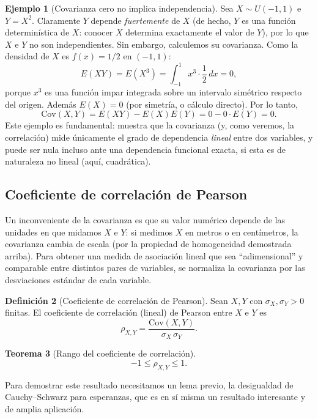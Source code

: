 \documentclass[11pt,a4paper]{article}
\theoremstyle{plain}
\newtheorem{teorema}{Teorema}[section]
\theoremstyle{definition}
\newtheorem{definicion}[teorema]{Definición}
\newtheorem{ejemplo}[teorema]{Ejemplo}
\theoremstyle{remark}
\begin{document}
\begin{ejemplo}[Covarianza cero no implica independencia]
\label{ej:cov-cero}
Sea $X\sim U(-1,1)$ e $Y=X^2$. Claramente $Y$ depende \emph{fuertemente} de $X$ (de hecho, $Y$ es una función determinística de $X$: conocer $X$ determina exactamente el valor de $Y$), por lo que $X$ e $Y$ no son independientes. Sin embargo, calculemos su covarianza. Como la densidad de $X$ es $f(x)=1/2$ en $(-1,1)$:
\[
E(XY) = E(X^3) = \int_{-1}^1 x^3\cdot\frac12\,dx = 0,
\]
porque $x^3$ es una función impar integrada sobre un intervalo simétrico respecto del origen. Además $E(X)=0$ (por simetría, o cálculo directo). Por lo tanto,
\[
\text{Cov}(X,Y) = E(XY)-E(X)E(Y) = 0 - 0\cdot E(Y) = 0.
\]
Este ejemplo es fundamental: muestra que la covarianza (y, como veremos, la correlación) mide únicamente el grado de dependencia \emph{lineal} entre dos variables, y puede ser nula incluso ante una dependencia funcional exacta, si esta es de naturaleza no lineal (aquí, cuadrática).
\end{ejemplo}

\subsection{Coeficiente de correlación de Pearson}

Un inconveniente de la covarianza es que su valor numérico depende de las unidades en que midamos $X$ e $Y$: si medimos $X$ en metros o en centímetros, la covarianza cambia de escala (por la propiedad de homogeneidad demostrada arriba). Para obtener una medida de asociación lineal que sea ``adimensional'' y comparable entre distintos pares de variables, se normaliza la covarianza por las desviaciones estándar de cada variable.

\begin{definicion}[Coeficiente de correlación de Pearson]
Sean $X,Y$ con $\sigma_X,\sigma_Y>0$ finitas. El coeficiente de correlación (lineal) de Pearson entre $X$ e $Y$ es
\[
\rho_{X,Y} = \frac{\text{Cov}(X,Y)}{\sigma_X\,\sigma_Y}.
\]
\end{definicion}

\begin{teorema}[Rango del coeficiente de correlación]
\[
-1 \leq \rho_{X,Y} \leq 1.
\]
\end{teorema}

Para demostrar este resultado necesitamos un lema previo, la desigualdad de Cauchy--Schwarz para esperanzas, que es en sí misma un resultado interesante y de amplia aplicación.
\end{document}
